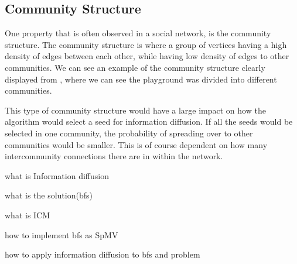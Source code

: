 \subsection{Community Structure}
One property that is often observed in a social network, is the community structure. The community structure is where a group of vertices having a high density of edges between each other, while having low density of edges to other communities. We can see an example of the community structure clearly displayed from \cite{RaceInSchool}, where we can see the playground was divided into different communities.

This type of community structure would have a large impact on how the algorithm would select a seed for information diffusion. If all the seeds would be selected in one community, the probability of spreading over to other communities would be smaller. This is of course dependent on how many intercommunity connections there are in within the network.



\begin{list}{1}
\item what is Information diffusion
\item what is the solution(bfs)
\item what is ICM
\item how to implement bfs as SpMV
\item how to apply information diffusion to bfs and problem
\item 
\end{list}

